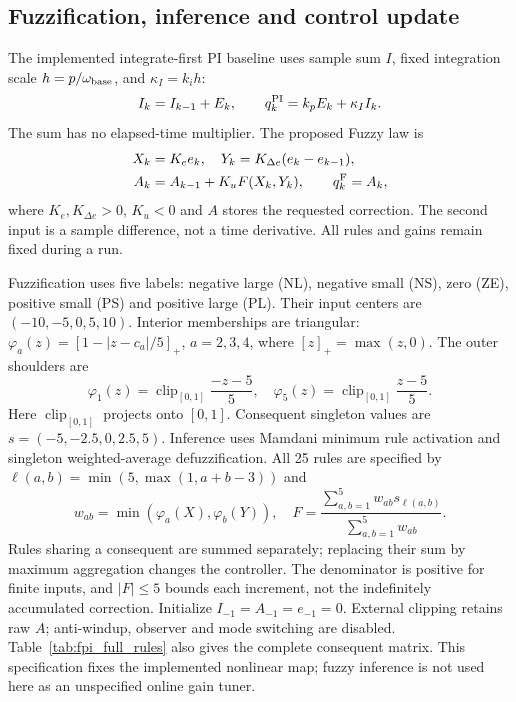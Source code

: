 \subsection{Fuzzification, inference and control update}
The implemented integrate-first PI baseline uses sample sum $I$, fixed integration
scale $h=p/\omega_{\rm base}$, and $\kappa_I=k_ih$:
\begin{equation}
 I_k=I_{k-1}+E_k,\qquad q_k^{\rm PI}=k_pE_k+\kappa_I I_k.
 \label{eq:fpi_native}
\end{equation}
The sum has no elapsed-time multiplier. The proposed Fuzzy law is
\begin{align}
 X_k&=K_e e_k,\quad Y_k=K_{\Delta e}(e_k-e_{k-1}),\nonumber\\
 A_k&=A_{k-1}+K_uF(X_k,Y_k),\qquad q_k^{\rm F}=A_k,
 \label{eq:fpi_fuzzy_law}
\end{align}
where $K_e,K_{\Delta e}>0$, $K_u<0$ and $A$ stores the requested
correction. The second input is a sample difference, not a time
derivative. All rules and gains remain fixed during a run.

Fuzzification uses five labels: negative large (NL), negative small (NS), zero (ZE),
positive small (PS) and positive large (PL). Their input centers are
$(-10,-5,0,5,10)$. Interior memberships are triangular:
$\varphi_a(z)=[1-|z-c_a|/5]_+$, $a=2,3,4$, where
$[z]_+=\max(z,0)$. The outer shoulders are
\begin{equation}
 \varphi_1(z)=\operatorname{clip}_{[0,1]}\frac{-z-5}{5},\quad
 \varphi_5(z)=\operatorname{clip}_{[0,1]}\frac{z-5}{5}.
\end{equation}
Here $\operatorname{clip}_{[0,1]}$ projects onto $[0,1]$.
Consequent singleton values are $s=(-5,-2.5,0,2.5,5)$.
Inference uses Mamdani minimum rule activation and singleton
weighted-average defuzzification. All 25 rules are specified by
$\ell(a,b)=\min(5,\max(1,a+b-3))$ and
\begin{equation}
 w_{ab}=\min(\varphi_a(X),\varphi_b(Y)),\quad
 F=\frac{\sum_{a,b=1}^5w_{ab}s_{\ell(a,b)}}{\sum_{a,b=1}^5w_{ab}}.
 \label{eq:fpi_rules}
\end{equation}
Rules sharing a consequent are summed separately; replacing their
sum by maximum aggregation changes the controller. The denominator
is positive for finite inputs, and $|F|\le5$ bounds each increment,
not the indefinitely accumulated correction. Initialize
$I_{-1}=A_{-1}=e_{-1}=0$. External clipping retains raw $A$;
anti-windup, observer and mode switching are disabled.
Table~\ref{tab:fpi_full_rules} also gives the complete consequent matrix.
This specification fixes the implemented nonlinear map; fuzzy inference
is not used here as an unspecified online gain tuner.

